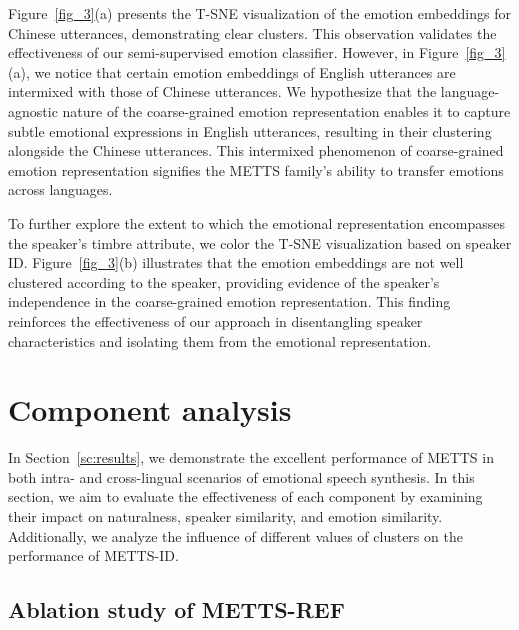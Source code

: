 \documentclass[journal,comsoc]{IEEEtran}
\begin{document}
Figure~\ref{fig_3}(a) presents the T-SNE visualization of the emotion embeddings for Chinese utterances, demonstrating clear clusters. This observation validates the effectiveness of our semi-supervised emotion classifier. However, in Figure~\ref{fig_3}(a), we notice that certain emotion embeddings of English utterances are intermixed with those of Chinese utterances. We hypothesize that the language-agnostic nature of the coarse-grained emotion representation enables it to capture subtle emotional expressions in English utterances, resulting in their clustering alongside the Chinese utterances. This intermixed phenomenon of coarse-grained emotion representation signifies the METTS family's ability to transfer emotions across languages.

To further explore the extent to which the emotional representation encompasses the speaker's timbre attribute, we color the T-SNE visualization based on speaker ID. Figure~\ref{fig_3}(b) illustrates that the emotion embeddings are not well clustered according to the speaker, providing evidence of the speaker's independence in the coarse-grained emotion representation. This finding reinforces the effectiveness of our approach in disentangling speaker characteristics and isolating them from the emotional representation.



\section{Component analysis}
\label{component}

In Section~\ref{sc:results}, we demonstrate the excellent performance of METTS in both intra- and cross-lingual scenarios of emotional speech synthesis.
In this section, we aim to evaluate the effectiveness of each component by examining their impact on naturalness, speaker similarity, and emotion similarity.
Additionally, we analyze the influence of different values of clusters on the performance of METTS-ID.

\subsection{Ablation study of METTS-REF}
\end{document}
